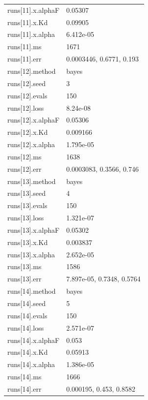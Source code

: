 {\begin{longtable}{p{}p{}}
{}runs[11].x.alphaF & 0.05307\\
{}runs[11].x.Kd & 0.09905\\
{}runs[11].x.alpha & 6.412e-05\\
{}runs[11].ms & 1671\\
{}runs[11].err & 0.0003446, 0.6771, 0.193\\
{}runs[12].method & bayes\\
{}runs[12].seed & 3\\
{}runs[12].evals & 150\\
{}runs[12].loss & 8.24e-08\\
{}runs[12].x.alphaF & 0.05306\\
{}runs[12].x.Kd & 0.009166\\
{}runs[12].x.alpha & 1.795e-05\\
{}runs[12].ms & 1638\\
{}runs[12].err & 0.0003083, 0.3566, 0.746\\
{}runs[13].method & bayes\\
{}runs[13].seed & 4\\
{}runs[13].evals & 150\\
{}runs[13].loss & 1.321e-07\\
{}runs[13].x.alphaF & 0.05302\\
{}runs[13].x.Kd & 0.003837\\
{}runs[13].x.alpha & 2.652e-05\\
{}runs[13].ms & 1586\\
{}runs[13].err & 7.897e-05, 0.7348, 0.5764\\
{}runs[14].method & bayes\\
{}runs[14].seed & 5\\
{}runs[14].evals & 150\\
{}runs[14].loss & 2.571e-07\\
{}runs[14].x.alphaF & 0.053\\
{}runs[14].x.Kd & 0.05913\\
{}runs[14].x.alpha & 1.386e-05\\
{}runs[14].ms & 1666\\
{}runs[14].err & 0.000195, 0.453, 0.8582\\
\bottomrule\end{longtable}}

